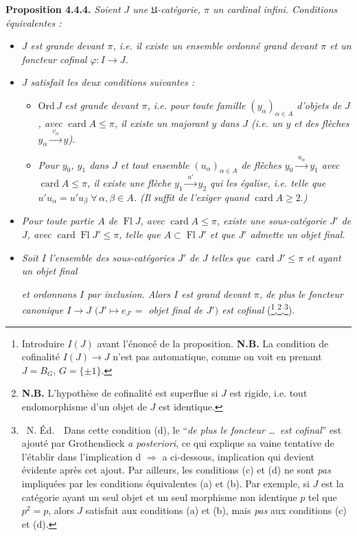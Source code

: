 \documentclass[11pt]{article}
\newcommand{\msp}[1]{\marginpar{\footnotesize [#1]}}
\newcommand{\card}{\operatorname{card}}
\newcommand{\Fl}{\operatorname{Fl}}
\begin{document}
\textbf{Proposition 4.4.4.} \textit{Soient $J$ une $\mathfrak{U}$-catégorie, $\pi$ un cardinal infini. Conditions équivalentes :}
\begin{itemize}[leftmargin=4em]
\item[\textit{a)}] \textit{$J$ est grande devant $\pi$, i.e. il existe un ensemble ordonné grand devant $\pi$ et un foncteur cofinal $\varphi : I \longrightarrow J$.}
\item[\textit{b)}] \textit{$J$ satisfait les deux conditions suivantes :}
\begin{itemize}[leftmargin=4em]
\item[$\mathrm{PF}_{\pi}\,1$] $\mathrm{Ord}\,J$ \textit{est grande devant $\pi$, i.e. pour toute famille $(y_\alpha)_{\alpha\in A}$ d'objets de $J$, avec} $\card A \leqslant \pi$\textit{, il existe un majorant $y$ dans $J$ (i.e. un $y$ et des flèches $y_\alpha \xrightarrow{\;v_\alpha\;} y$).}
\item[$\mathrm{PF}_{\pi}\,2$] \textit{Pour $y_0$, $y_1$ dans $J$ et tout ensemble $(u_\alpha)_{\alpha\in A}$ de flèches $y_0 \xrightarrow{\;u_\alpha\;} y_1$ avec} $\card A \leqslant \pi$\textit{, il existe une flèche $y_1 \xrightarrow{\;u'\;} y_2$ qui les égalise, i.e. telle que $u'u_\alpha = u'u_\beta \;\forall\, \alpha,\beta \in A$. (Il suffit de l'exiger quand} $\card A \geqslant 2$.\textit{)}
\end{itemize}
\item[\textit{c)}] \textit{Pour toute partie $A$ de} $\Fl J$\textit{, avec} $\card A \leqslant \pi$\textit{, existe une sous-catégorie $J'$ de $J$, avec} $\card\Fl J' \leqslant \pi$\textit{, telle que $A \subset \Fl J'$ et que $J'$ admette un objet final.}
\item[\textit{d)}] \textit{Soit $I$ l'ensemble des sous-catégories $J'$ de $J$ telles que} $\card J' \leqslant \pi$ \textit{et ayant un objet final}

\msp{page 82}
\textit{et ordonnons $I$ par inclusion. Alors $I$ est grand devant $\pi$, de plus le foncteur canonique $I \longrightarrow J$ $(J' \longmapsto e_{J'} =$ objet final de $J')$ est cofinal} (\footnote{Introduire $I(J)$ avant l'énoncé de la proposition. \textbf{N.B.} La condition de cofinalité $I(J) \longrightarrow J$ n'est pas automatique, comme on voit en prenant $J = B_G$, $G = \{\pm 1\}$.},\footnote{\textbf{N.B.} L'hypothèse de cofinalité est superflue si $J$ est rigide, i.e. tout endomorphisme d'un objet de $J$ est identique.},\footnote{\ N. Éd.\ \ Dans cette condition (d), le “\textit{de plus le foncteur \dots\ est cofinal}” est ajouté par Grothendieck \textit{a posteriori}, ce qui explique sa vaine tentative de l'établir dans l'implication d $\Longrightarrow$ a ci-dessous, implication qui devient évidente après cet ajout. Par ailleurs, les conditions (c) et (d) ne sont \textit{pas} impliquées par les conditions équivalentes (a) et (b). Par exemple, si $J$ est la catégorie ayant un seul objet et un seul morphisme non identique $p$ tel que $p^2 = p$, alors $J$ satisfait aux conditions (a) et (b), mais \textit{pas} aux conditions (c) et (d).}).
\end{itemize}
\end{document}
